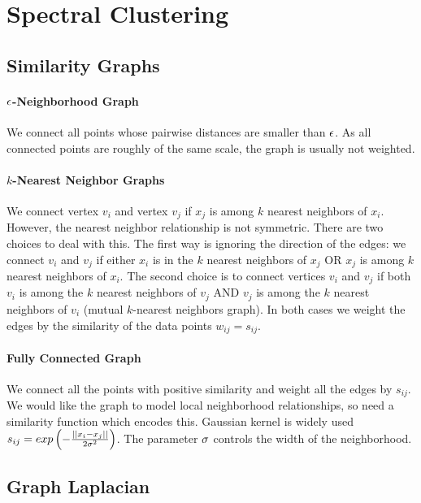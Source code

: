 \section{Spectral Clustering}
\label{section10.2}

\subsection{Similarity Graphs}
\label{section10.2.1}

\paragraph{$\epsilon$-Neighborhood Graph}

We connect all points whose pairwise distances are smaller than $\epsilon$. As all connected points are roughly of the same scale, the graph is usually not weighted.

\paragraph{$k$-Nearest Neighbor Graphs}

We connect vertex $v_i$ and vertex $v_j$ if $x_j$ is among $k$ nearest neighbors of $x_i$. However, the nearest neighbor relationship is not symmetric. There are two choices to deal with this. The first way is ignoring the direction of the edges: we connect $v_i$ and $v_j$ if either $x_i$ is in the $k$ nearest neighbors of $x_j$ OR $x_j$ is among $k$ nearest neighbors of $x_i$. The second choice is to connect vertices $v_i$ and $v_j$ if both $v_i$ is among the $k$ nearest neighbors of $v_j$ AND $v_j$ is among the $k$ nearest neighbors of $v_i$ (mutual $k$-nearest neighbors graph). In both cases we weight the edges by the similarity of the data points $w_{ij}=s_{ij}$.

\paragraph{Fully Connected Graph}

We connect all the points with positive similarity and weight all the edges by $s_{ij}$. We would like the graph to model local neighborhood relationships, so need a similarity function which encodes this. Gaussian kernel is widely used $s_{ij}=exp\left(-\frac{\left\vert\left\vert x_i-x_j \right\vert\right\vert}{2\sigma^2}\right)$. The parameter $\sigma$ controls the width of the neighborhood.

\subsection{Graph Laplacian}

